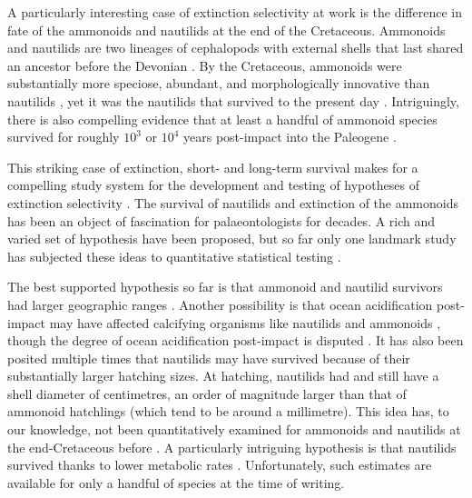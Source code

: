 \documentclass[a4paper]{article}
\begin{document}
A particularly interesting case of extinction selectivity at work is the difference in fate of the ammonoids and nautilids at the end of the Cretaceous. 
Ammonoids and nautilids are two lineages of cephalopods with external shells that last shared an ancestor before the Devonian \parencite{krogerCephalopodOriginEvolution2011}. By the Cretaceous, ammonoids were substantially more speciose, abundant, and morphologically innovative than nautilids \parencite{hoffmannRecentAdvancesHeteromorph2021, landmanAmmoniteExtinctionNautilid2014}, yet it was the nautilids that survived to the present day \parencite{wardNautilusBiologySystematics2016}.
Intriguingly, there is also compelling evidence that at least a handful of ammonoid species survived for roughly $10^{3}$ or $10^{4}$ years post-impact into the Paleogene \parencite{
jagt2003early,
machalskiEvidenceAmmoniteSurvival2005,
jagtAmmonietenUitHet2012,
vellekoopTypeMaastrichtianGastropodFaunas2020, machalskiAmmoniteSurvivalCretaceous2025}.

This striking case of extinction, short- and long-term survival makes for a compelling study system for the development and testing of hypotheses of extinction selectivity \parencite{landmanAmmoniteExtinctionNautilid2014}.
The survival of nautilids and extinction of the ammonoids has been an object of fascination for palaeontologists for decades. A rich and varied set of hypothesis have been proposed, but so far only one landmark study has subjected these ideas to quantitative statistical testing \parencite{landmanAmmoniteExtinctionNautilid2014}.

The best supported hypothesis so far is that ammonoid and nautilid survivors had larger geographic ranges \parencite{landmanAmmoniteExtinctionNautilid2014}. Another possibility is that ocean acidification post-impact may have affected calcifying organisms like nautilids and ammonoids \parencite{alegretEndCretaceousMarineMass2012, henehanRapidOceanAcidification2019, weberRelativeThicknessAmmonoid2022}, though the degree of ocean acidification post-impact is disputed \parencite{yingDarknessBodySize2026}. It has also been posited multiple times that nautilids may have survived because of their substantially larger hatching sizes. At hatching, nautilids had and still have a shell diameter of centimetres, an order of magnitude larger than that of ammonoid hatchlings (which tend to be around a millimetre).
This idea has, to our knowledge, not been quantitatively examined for ammonoids and nautilids at the end-Cretaceous before \parencite{stilwellRecordsNautiloideaMollusca1996, waniLargeHatchlingSize2011, debaetsEarlyEvolutionaryTrends2012, laptikhovskyEnvironmentalImpactEctocochleate2013, tajikaOldNewPlankton2018, tajikaIntraInterspecificVariability2022}.
A particularly intriguing hypothesis is that nautilids survived thanks to lower metabolic rates \parencite{tajikaChamberVolumeDevelopment2020, tajikaAmmonoidExtinctionNautiloid2023}. Unfortunately, such estimates are available for only a handful of species at the time of writing. 
\end{document}
